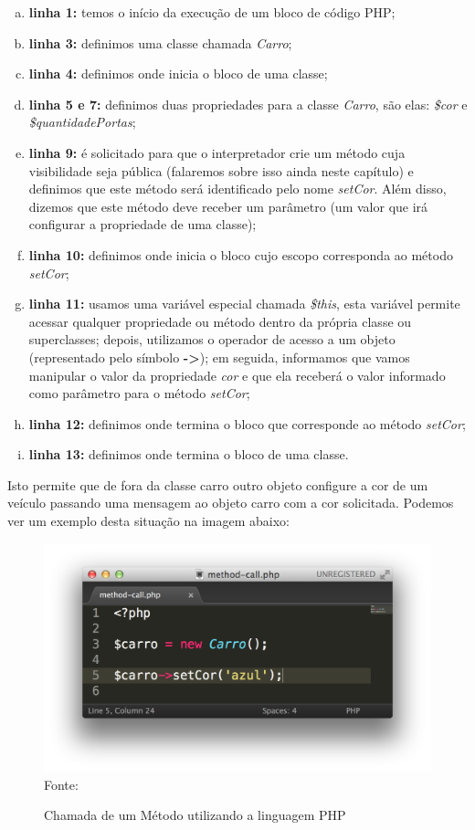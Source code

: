 \begin{enumerate}[a)]
    \item \textbf{linha 1:} temos o início da execução de um bloco de código PHP;
    \item \textbf{linha 3:} definimos uma classe chamada \textit{Carro};
    \item \textbf{linha 4:} definimos onde inicia o bloco de uma classe;
    \item \textbf{linha 5 e 7:} definimos duas propriedades para a classe
    \textit{Carro}, são elas: \textit{\$cor} e \textit{\$quantidadePortas};
    \item \textbf{linha 9:} é solicitado para que o interpretador crie um método
    cuja visibilidade seja pública (falaremos sobre isso ainda neste capítulo) 
    e definimos que este método será identificado pelo nome \textit{setCor}.
    Além disso, dizemos que este método deve receber um parâmetro (um valor 
    que  irá configurar a propriedade de uma classe);
    \item \textbf{linha 10:} definimos onde inicia o bloco cujo escopo
    corresponda ao método \textit{setCor};
    \item \textbf{linha 11:} usamos uma variável especial chamada
    \textit{\$this}, esta variável permite acessar qualquer propriedade ou
    método dentro da própria classe ou superclasses; depois, utilizamos o 
    operador de acesso a um objeto (representado pelo símbolo \textbf{->}); em
    seguida, informamos que vamos manipular o valor da propriedade \textit{cor}
    e que ela receberá o valor informado como parâmetro para o método \textit{setCor};
    \item \textbf{linha 12:} definimos onde termina o bloco que corresponde ao
    método \textit{setCor};
    \item \textbf{linha 13:} definimos onde termina o bloco de uma classe.
\end{enumerate}
				
Isto permite que de fora da classe carro outro objeto configure a cor de um
veículo passando uma mensagem ao objeto carro com a cor solicitada. Podemos ver 
um exemplo desta situação na imagem abaixo:

\begin{figure}[h!tb]
	\centering
	\caption{Chamada de um Método utilizando a linguagem PHP}
	\includegraphics[width=\textwidth]{images/method-call.png}
	\label{fig:chamadaMetodo}
	\centering
	\footnotesize Fonte: \fonteOAutor
\end{figure}

